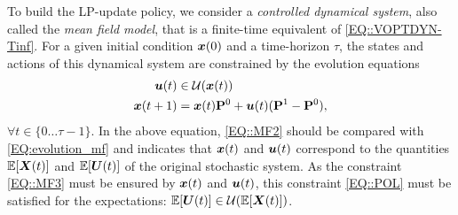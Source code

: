 
To build the LP-update policy, we consider a \emph{controlled dynamical system}, also called the \emph{mean field model}, that is a finite-time equivalent of \eqref{EQ::VOPTDYN-Tinf}. For a given initial condition ${\bm{x}}(0)$ and a time-horizon $\tau$, the states and actions of this dynamical system are constrained by the evolution equations 
\begin{subequations}
    \label{EQ:MeanField}
    \begin{align}
        \bm{u}(t) &\in \mathcal{U}({\bm{x}}(t))  \label{EQ::MF3} \\
        {\bm{x}}({t + 1}) &= {\bm{x}}(t) \mathbf{P}^{0}  + \bm{u}(t) (\mathbf{P}^{1} - \mathbf{P}^{0}) , \label{EQ::MF2}
    \end{align}
\end{subequations}
$\forall t\in\{0\dots \tau-1\}$. In the above equation, \eqref{EQ::MF2} should be compared with  \eqref{EQ:evolution_mf} and indicates that ${\bm{x}}(t)$ and $\bm{u}(t)$ correspond to the quantities $\mathbb{E}[{\bm{X}(t)}]$ and $\mathbb{E}[\bm{U}(t)]$ of the original stochastic system. As the constraint \eqref{EQ::MF3} must be ensured by ${\bm{x}}(t)$ and $\bm{u}(t)$, this constraint \eqref{EQ::POL} must be satisfied for the expectations: $\mathbb{E}[\bm{U}(t)]\in\mathcal{U}(\mathbb{E}[{\bm{X}(t)}])$.

